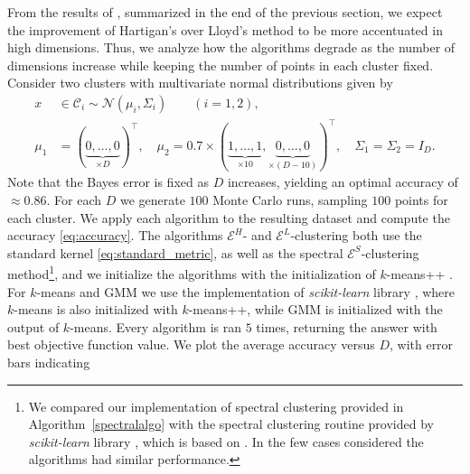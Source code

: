 \documentclass[aps,preprint,nofootinbib,floatfix]{revtex4-1}
\newcommand\C{{\mathcal{C}}}
\begin{document}
From the results of \cite{Telgarsky}, summarized in the end of the previous
section, we expect the improvement of Hartigan's 
over Lloyd's method to be more accentuated in high dimensions.
Thus, we analyze
how the algorithms degrade as the number of dimensions increase while
keeping the number of points in each cluster fixed.
Consider
two clusters with multivariate normal distributions given by
\begin{equation}
\label{eq:gauss1}
\begin{split}
x &\in \C_i  \sim 
\mathcal{N}(\mu_i,\Sigma_i) \qquad (i=1,2),  \\
\mu_1 &= (\underbrace{0,\dotsc,0}_{\times D})^\top , \quad
\mu_2 = 0.7 \times (\underbrace{1,\dots,1}_{\times 10},
\underbrace{0,\dots,0}_{\times (D-10)})^\top, \quad
\Sigma_1 = \Sigma_2 = I_D.
\end{split}
\end{equation}
Note that the Bayes error
is fixed as $D$ increases, yielding an optimal 
accuracy of $\approx 0.86$.
For each $D$ we generate $100$ Monte Carlo runs, 
sampling $100$ points for each cluster.
We apply each algorithm to the resulting dataset 
and compute the accuracy \eqref{eq:accuracy}. The algorithms
$\mathcal{E}^H$- and $\mathcal{E}^L$-clustering
both use the standard
kernel \eqref{eq:standard_metric}, as well as the spectral
$\mathcal{E}^S$-clustering method\footnote{We
compared our implementation of spectral clustering provided in
Algorithm~\ref{spectralalgo} with the spectral clustering routine provided
by \emph{scikit-learn} library \cite{scikit-learn}, 
which is based on \cite{Malik}. In the few
cases considered the algorithms had similar performance.
}, 
and we initialize the algorithms
with the initialization of $k$-means++ \cite{Vassilvitskii}.
For $k$-means and GMM we use the implementation of \emph{scikit-learn} library
\cite{scikit-learn}, where $k$-means is also initialized with $k$-means++,
while GMM is initialized with the output of $k$-means. Every algorithm
is ran $5$ times, returning the answer with best objective function value.
We plot the average accuracy versus $D$, with error bars indicating
\end{document}
